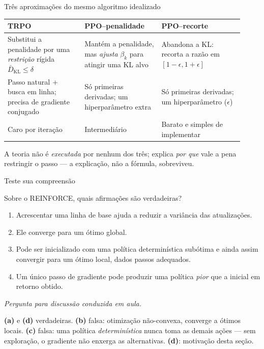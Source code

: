\documentclass[aspectratio=169, 10pt]{beamer}
\newcommand{\paradiscussao}{\smallskip
  {\footnotesize\color{rlCinza}\itshape Pergunta para discussão conduzida em aula.}}
\begin{document}
\begin{frame}{Três aproximações do mesmo algoritmo idealizado}

  \begin{center}\small
  \begin{tabular}{@{}p{0.30\linewidth}p{0.30\linewidth}p{0.32\linewidth}@{}}
    \toprule
    \textbf{TRPO} & \textbf{PPO--penalidade} & \textbf{PPO--recorte}\\
    \midrule
    Substitui a penalidade por uma \emph{restrição} rígida
      $\bar{D}_{\mathrm{KL}} \le \delta$ &
    Mantém a penalidade, mas \emph{ajusta} $\beta_k$ para atingir uma KL alvo &
    Abandona a KL: recorta a razão em $[1-\epsilon, 1+\epsilon]$\\[0.4em]
    Passo natural + busca em linha; precisa de gradiente conjugado &
    Só primeiras derivadas; um hiperparâmetro extra &
    Só primeiras derivadas; um hiperparâmetro ($\epsilon$)\\[0.4em]
    Caro por iteração &
    Intermediário &
    Barato e simples de implementar\\
    \bottomrule
  \end{tabular}
  \end{center}

  \begin{ideiabox}
    A teoria não é \emph{executada} por nenhum dos três; explica \emph{por que} vale
    a pena restringir o passo --- a explicação, não a fórmula, sobreviveu.
  \end{ideiabox}
\end{frame}

\begin{frame}{Teste sua compreensão}

  \begin{quizbox}{}
    Sobre o REINFORCE, quais afirmações são verdadeiras?
    \begin{enumerate}\setlength{\itemsep}{0.1ex}\small
      \item[(a)] Acrescentar uma linha de base ajuda a reduzir a variância das
        atualizações.
      \item[(b)] Ele converge para um ótimo global.
      \item[(c)] Pode ser inicializado com uma política determinística subótima e
        ainda assim convergir para um ótimo local, dados passos adequados.
      \item[(d)] Um único passo de gradiente pode produzir uma política
        \emph{pior} que a inicial em retorno obtido.
    \end{enumerate}
    \paradiscussao
  \end{quizbox}

  \pause
  \begin{respbox}
    \textbf{(a)} e \textbf{(d)} verdadeiras. \textbf{(b)} falsa: otimização
    não-convexa, converge a ótimos locais. \textbf{(c)} falsa: uma política
    \emph{determinística} nunca toma as demais ações --- sem exploração, o gradiente
    não enxerga as alternativas. \textbf{(d)}: motivação desta seção.
  \end{respbox}
\end{frame}
\end{document}
